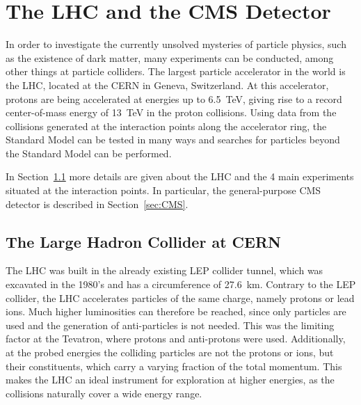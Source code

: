 \graphicspath{{chapt_dutch/}{intro/}{chapt2/}{chapt3/}{chapt4/}{chapt5/}}

\renewcommand\evenpagerightmark{{\scshape\small Chapter 3}}
\renewcommand\oddpageleftmark{{\scshape\small The LHC and the CMS Detector}}

\hyphenation{}

\chapter{The LHC and the CMS Detector}
\label{ch3}

In order to investigate the currently unsolved mysteries of particle physics, such as the existence of dark matter, many experiments can be conducted, among other things at particle colliders. The largest particle accelerator in the world is the \ac{LHC}, located at the \ac{CERN} in Geneva, Switzerland. At this accelerator, protons are being accelerated at energies up to \SI{6.5}{TeV}, giving rise to a record center-of-mass energy of \SI{13}{TeV} in the proton collisions. Using data from the collisions generated at the interaction points along the accelerator ring, the Standard Model can be tested in many ways and searches for particles beyond the Standard Model can be performed. 

In Section~\ref{sec:lhc} more details are given about the \ac{LHC} and the 4 main experiments situated at the interaction points. In particular, the general-purpose \ac{CMS} detector is described in Section~\ref{sec:CMS}.

\section{The Large Hadron Collider at CERN} 
\label{sec:lhc}

The \ac{LHC} was built in the already existing \ac{LEP} collider tunnel, which was excavated in the 1980's and has a circumference of 27.6~km. Contrary to the \ac{LEP} collider, the \ac{LHC} accelerates particles of the same charge, namely protons or lead ions. Much higher luminosities can therefore be reached, since only particles are used and the generation of anti-particles is not needed. This was the limiting factor at the Tevatron, where protons and anti-protons were used. Additionally, at the probed energies the colliding particles are not the protons or ions, but their constituents, which carry a varying fraction of the total momentum. %
This makes the \ac{LHC} an ideal instrument for exploration at higher energies, as the collisions naturally cover a wide energy range.

